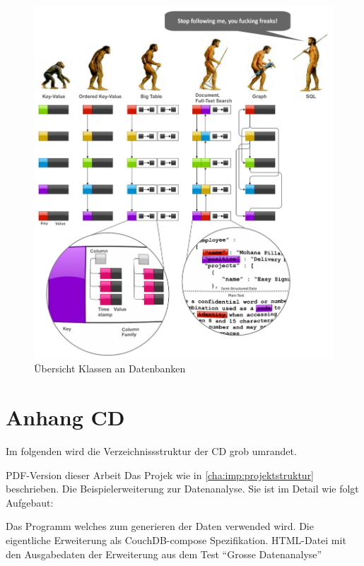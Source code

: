 \begin{figure}
    \centering
    \includegraphics[width=\textwidth]{images/databases-overview.png}
    \caption{Übersicht Klassen an Datenbanken}
    \label{fig:klassen-datenbanken}
\end{figure}

\chapter{Anhang CD}

Im folgenden wird die Verzeichnissstruktur der CD grob umrandet.

\begin{itemize}
     PDF-Version dieser Arbeit
    \dhitem[juggler] Das Projek wie in \cref{cha:imp:projektstruktur} beschrieben.
    \dhitem[evolve] Die Beispielerweiterung zur Datenanalyse.
    Sie ist im Detail wie folgt Aufgebaut:
    \begin{itemize}
            \dhitem[funfind.py] Das Programm welches zum generieren der Daten verwended wird.
            \dhitem[composeapp] Die eigentliche Erweiterung als CouchDB-compose Spezifikation.
             HTML-Datei mit den Ausgabedaten der Erweiterung aus dem Test ``Grosse Datenanalyse''
    \end{itemize}
\end{itemize}
